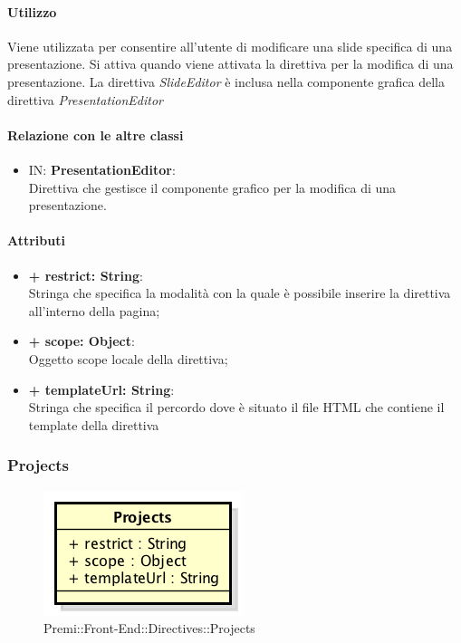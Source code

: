 	\paragraph{Utilizzo}
	Viene utilizzata per consentire all'utente di modificare una slide specifica di una presentazione. Si attiva quando viene attivata la direttiva per la modifica di una presentazione. La direttiva \textit{SlideEditor} è inclusa nella componente grafica della direttiva \textit{PresentationEditor}
	
	\paragraph{Relazione con le altre classi}
	\begin{itemize}
		\item IN: \textbf{PresentationEditor}:\\
		Direttiva che gestisce il componente grafico per la modifica di una presentazione.
	\end{itemize}
	
	\paragraph{Attributi}
	\begin{itemize}
		\item \textbf{+ restrict: String}:\\
		Stringa che specifica la modalità con la quale è possibile inserire la direttiva all'interno della pagina;
		\item \textbf{+ scope: Object}:\\
		Oggetto scope locale della direttiva;
		\item \textbf{+ templateUrl: String}:\\
		Stringa che specifica il percordo dove è situato il file HTML che contiene il template della direttiva
	\end{itemize}
\newpage


\subsubsection{Projects}
	\begin{figure}[h]
		\centering
		\includegraphics[width=0.5\linewidth]{img/premi_front_end_directives_projects}
		\caption[Premi::Front-End::Directives::Projects]{Premi::Front-End::Directives::Projects}
	\end{figure}
	
